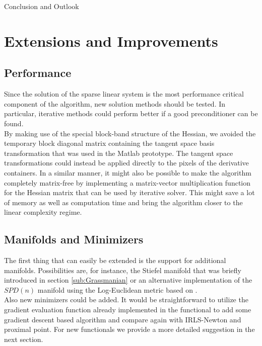 \begin{chapter}{Conclusion and Outlook}
\section{Extensions and Improvements} %
\label{sec:Extensions}
\subsection{Performance}
Since the solution of the sparse linear system is the most performance critical component of the algorithm, new 
solution methods should be tested. In particular, iterative methods could perform better if a good preconditioner
can be found. \\

By making use of the special block-band structure of the Hessian, we avoided the temporary block diagonal 
matrix containing the tangent space basis transformation that was used in the Matlab prototype. The tangent space
transformations could instead be applied directly to the pixels of the derivative containers.
In a similar manner, it might also be possible to make the algorithm completely matrix-free by 
implementing a matrix-vector multiplication function for the Hessian matrix that can be used by iterative solver.
This might save a lot of memory as well as computation time and bring the algorithm closer to the linear complexity
regime.

\subsection{Manifolds and Minimizers}
The first thing that can easily be extended is the support for additional manifolds. Possibilities are, for instance, the Stiefel manifold that
was briefly introduced in section \ref{sub:Grassmanian} or an alternative implementation of the $SPD(n)$ manifold using the Log-Euclidean metric
based on \cite{LogEuclidian}.\\

Also new minimizers could be added. It would be straightforward to utilize the gradient evaluation function already implemented in the functional to
add some gradient descent based algorithm and compare again with IRLS-Newton and proximal point. For new functionals we provide a more detailed suggestion
in the next section.


\end{chapter}
